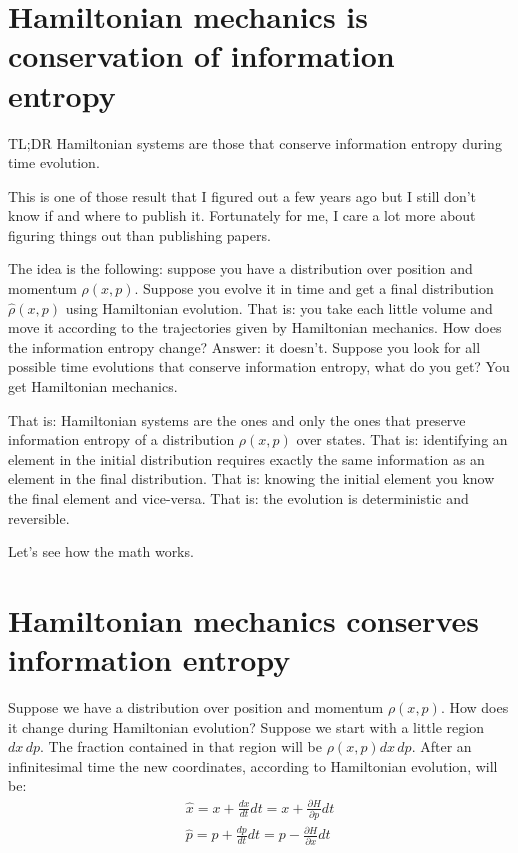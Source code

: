 \documentclass[aps,pra,10pt,floatfix,nofootinbib]{revtex4-1}
\theoremstyle{definition}
\begin{document}
	
\section{Hamiltonian mechanics is conservation of information entropy}

TL;DR Hamiltonian systems are those that conserve information entropy during time evolution.

This is one of those result that I figured out a few years ago but I still don't know if and where to publish it. Fortunately for me, I care a lot more about figuring things out than publishing papers.

The idea is the following: suppose you have a distribution over position and momentum $\rho(x, p)$. Suppose you evolve it in time and get a final distribution $\hat{\rho}(x, p)$ using Hamiltonian evolution. That is: you take each little volume and move it according to the trajectories given by Hamiltonian mechanics. How does the information entropy change? Answer: it doesn't. Suppose you look for all possible time evolutions that conserve information entropy, what do you get? You get Hamiltonian mechanics.

That is: Hamiltonian systems are the ones and only the ones that preserve information entropy of a distribution $\rho(x, p)$ over states. That is: identifying an element in the initial distribution requires exactly the same information as an element in the final distribution. That is: knowing the initial element you know the final element and vice-versa. That is: the evolution is deterministic and reversible.

Let's see how the math works.

\section{Hamiltonian mechanics conserves information entropy}

Suppose we have a distribution over position and momentum $\rho(x, p)$. How does it change during Hamiltonian evolution? Suppose we start with a little region $dx \,dp$. The fraction contained in that region will be $\rho(x, p) dx \,dp$. After an infinitesimal time the new coordinates, according to Hamiltonian evolution, will be:
\begin{equation}
\begin{aligned}
\hat{x} = x + \frac{dx}{dt} dt = x + \frac{\partial H}{\partial p} dt  \\
\hat{p} = p + \frac{dp}{dt} dt = p - \frac{\partial H}{\partial x} dt  \\
\end{aligned}
\label{newCoordinates}
\end{equation}
\end{document}
